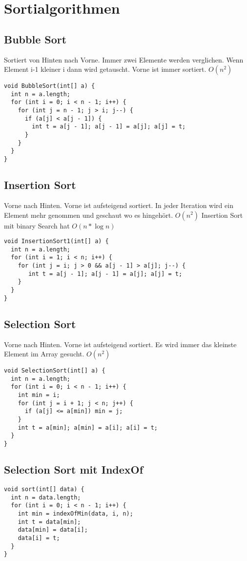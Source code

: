 \pagebreak
\section*{Sortialgorithmen}
\subsection*{Bubble Sort}
Sortiert von Hinten nach Vorne. Immer zwei Elemente werden verglichen. Wenn Element i-1 kleiner i dann wird getauscht. Vorne ist immer sortiert. $O(n^2)$
\begin{verbatim}
void BubbleSort(int[] a) {
  int n = a.length;
  for (int i = 0; i < n - 1; i++) {
    for (int j = n - 1; j > i; j--) { 
      if (a[j] < a[j - 1]) {
        int t = a[j - 1]; a[j - 1] = a[j]; a[j] = t; 
      }
    }
  }
}

\end{verbatim}
\subsection*{Insertion Sort}
Vorne nach Hinten. Vorne ist aufsteigend sortiert. In jeder Iteration wird ein Element mehr genommen und geschaut wo es hingehört. $O(n^2)$
Insertion Sort mit binary Search hat $O(n*\log{}n)$  
\begin{verbatim}
void InsertionSort1(int[] a) { 
  int n = a.length;
  for (int i = 1; i < n; i++) {
    for (int j = i; j > 0 && a[j - 1] > a[j]; j--) {
       int t = a[j - 1]; a[j - 1] = a[j]; a[j] = t; 
    }
  } 
}
\end{verbatim}
\subsection*{Selection Sort}
Vorne nach Hinten. Vorne ist aufsteigend sortiert. Es wird immer das kleinste Element im Array gesucht. $O(n^2)$ 
\begin{verbatim}
void SelectionSort(int[] a) {
  int n = a.length;
  for (int i = 0; i < n - 1; i++) {
    int min = i;
    for (int j = i + 1; j < n; j++) {
      if (a[j] <= a[min]) min = j; 
    }
    int t = a[min]; a[min] = a[i]; a[i] = t; 
  }
}
\end{verbatim}
\subsection*{Selection Sort mit IndexOf}
\begin{verbatim}
void sort(int[] data) {
  int n = data.length;
  for (int i = 0; i < n - 1; i++) {
    int min = indexOfMin(data, i, n);
    int t = data[min];
    data[min] = data[i];
    data[i] = t;
  }
}
\end{verbatim}